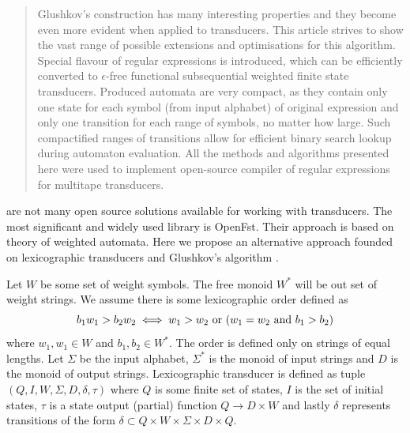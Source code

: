 
\begin{abstract}
 Glushkov's construction has many interesting properties and they become even more evident when applied to transducers. This article strives to show the vast range of possible extensions and optimisations for this algorithm.  Special flavour of regular expressions is introduced, which can be efficiently converted to $\epsilon$-free functional subsequential weighted finite state transducers. Produced automata are very compact, as they contain only one state for each symbol (from input alphabet) of original expression and only one transition for each range of symbols, no matter how large. Such compactified ranges of transitions allow for efficient binary search lookup during automaton evaluation. All the methods and algorithms presented here were used to implement open-source compiler of regular expressions for multitape transducers. 
\end{abstract}


 are not many open source solutions available for working with transducers. The most significant and widely used library is OpenFst. Their approach is based on theory of weighted automata\cite{MOHRI3}\cite{DROSTE}\cite{DROSTE2}. Here we propose an alternative approach founded on lexicographic transducers \cite{MendozaDrosik2020MultitapeAA} and Glushkov's algorithm \cite{GLUSHKOV}.


Let $W$ be some set of weight symbols. The free monoid $W^*$ will be out set of weight strings. We assume there is some lexicographic order defined as
\[
b_1w_1 > b_2w_2 \iff w_1 > w_2 \mbox{ or }( w_1=w_2\mbox{ and } b_1 > b_2) \\
\]
where $w_1,w_1\in W$ and $b_1,b_2\in W^*$.  The order is defined only on strings of equal lengths.
Let $\Sigma$ be the input alphabet, $\Sigma^*$ is the monoid of input strings and $D$ is the monoid of output strings.  Lexicographic transducer is defined as tuple $(Q,I,W,\Sigma,D,\delta,\tau)$ where $Q$ is some finite set of states, $I$ is the set of initial states, $\tau$ is a state output (partial) function $Q\rightarrow D \times W$ and lastly $\delta$ represents transitions of the form $\delta \subset Q \times W \times \Sigma \times D \times Q$.

